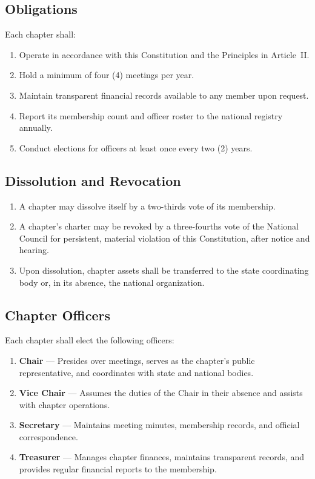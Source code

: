 \documentclass[11pt, letterpaper]{article}
\begin{document}
\subsection{Obligations}
Each chapter shall:
\begin{enumerate}
  \item Operate in accordance with this Constitution and the Principles in Article~II.
  \item Hold a minimum of four (4) meetings per year.
  \item Maintain transparent financial records available to any member upon request.
  \item Report its membership count and officer roster to the national registry annually.
  \item Conduct elections for officers at least once every two (2) years.
\end{enumerate}

\subsection{Dissolution and Revocation}
\begin{enumerate}
  \item A chapter may dissolve itself by a two-thirds vote of its membership.
  \item A chapter's charter may be revoked by a three-fourths vote of the National Council for persistent, material violation of this Constitution, after notice and hearing.
  \item Upon dissolution, chapter assets shall be transferred to the state coordinating body or, in its absence, the national organization.
\end{enumerate}



\subsection{Chapter Officers}
Each chapter shall elect the following officers:
\begin{enumerate}
  \item \textbf{Chair} --- Presides over meetings, serves as the chapter's public representative, and coordinates with state and national bodies.
  \item \textbf{Vice Chair} --- Assumes the duties of the Chair in their absence and assists with chapter operations.
  \item \textbf{Secretary} --- Maintains meeting minutes, membership records, and official correspondence.
  \item \textbf{Treasurer} --- Manages chapter finances, maintains transparent records, and provides regular financial reports to the membership.
\end{enumerate}
\end{document}
